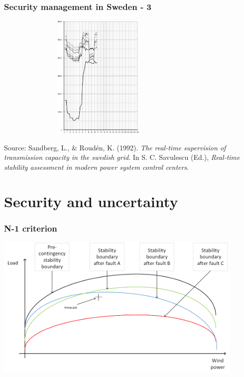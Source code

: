 \documentclass{beamer}
\begin{document}
\begin{frame}
\frametitle{Security management in Sweden - 3}
\begin{center}
\includegraphics[height=6cm,width=0.75\textwidth]{Figs/SpicaResults.png}

\footnotesize{Source: Sandberg, L., \& Roudén, K. (1992). \textit{The real-time supervision of transmission capacity in the swedish grid}. In S. C. Savulescu (Ed.), \textit{Real-time stability assessment in modern power system control centers}.}
\end{center}
\end{frame}

\section{Security and uncertainty}

\begin{frame}
\frametitle{N-1 criterion}
\includegraphics[width=0.9\textwidth]{Figs/StabBound-with-forecast.png}
\end{frame}
\end{document}

